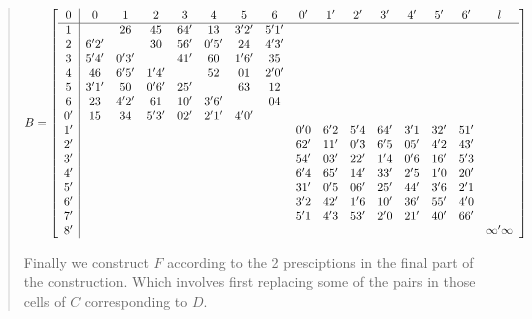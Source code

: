 \documentclass[
  11pt,
  a4paper]{book}
\begin{document}
\begin{quote}
\begin{equation}
  B = \left[\begin{array}{c|*{15}c}
 0  &  0   &   1  &   2  &  3  &  4   &   5  &   6  &  0' &  1' &  2' &  3' &  4' &  5' &  6' & l \\ \hline
 1  &      &  26  &  45  & 64' & 13   & 3'2' & 5'1' &     &     &     &     &     &     &     & \\
 2  & 6'2' &      &  30  & 56' & 0'5' & 24   & 4'3' &     &     &     &     &     &     &     & \\
 3  & 5'4' & 0'3' &      & 41' & 60   & 1'6' &  35  &     &     &     &     &     &     &     & \\
 4  &  46  & 6'5' & 1'4' &     & 52   & 01   & 2'0' &     &     &     &     &     &     &     & \\
 5  & 3'1' &  50  & 0'6' & 25' &      & 63   & 12   &     &     &     &     &     &     &     & \\
 6  &  23  & 4'2' &  61  & 10' & 3'6' &      & 04   &     &     &     &     &     &     &     & \\
 0' &  15  &  34  & 5'3' & 02' & 2'1' & 4'0' &      &     &     &     &     &     &     &     & \\
 1' &      &      &      &     &      &      &      & 0'0 & 6'2 & 5'4 & 64' & 3'1 & 32' & 51' & \\
 2' &      &      &      &     &      &      &      & 62' & 11' & 0'3 & 6'5 & 05' & 4'2 & 43' & \\
 3' &      &      &      &     &      &      &      & 54' & 03' & 22' & 1'4 & 0'6 & 16' & 5'3 & \\
 4' &      &      &      &     &      &      &      & 6'4 & 65' & 14' & 33' & 2'5 & 1'0 & 20' & \\
 5' &      &      &      &     &      &      &      & 31' & 0'5 & 06' & 25' & 44' & 3'6 & 2'1 & \\
 6' &      &      &      &     &      &      &      & 3'2 & 42' & 1'6 & 10' & 36' & 55' & 4'0 & \\
 7' &      &      &      &     &      &      &      & 5'1 & 4'3 & 53' & 2'0 & 21' & 40' & 66' & \\
 8' &      &      &      &     &      &      &      &     &     &     &     &     &     &     & \infty'\infty \\
  \end{array}\right]
\end{equation}

Finally we construct $F$ according to the 2 presciptions in
the final part of the construction. Which involves first
replacing some of the pairs in those cells of $C$
corresponding to $D$.


\end{quote}
\end{document}

